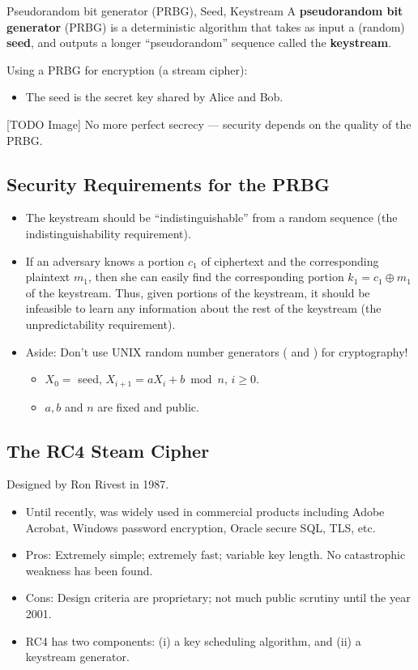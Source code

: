 \begin{Definition}{Pseudorandom bit generator (PRBG), Seed, Keystream}{}
      A \textbf{pseudorandom bit generator} (PRBG) is a
      deterministic algorithm that takes as input a (random) \textbf{seed},
      and outputs a longer ``pseudorandom'' sequence called the \textbf{keystream}.
\end{Definition}

Using a PRBG for encryption (a stream cipher):
\begin{itemize}
      \item The seed is the secret key shared by Alice and Bob.
\end{itemize}
[TODO Image]
No more perfect secrecy --- security depends on the quality of the PRBG\@.

\subsection*{Security Requirements for the PRBG}
\begin{itemize}
      \item The keystream should be ``indistinguishable'' from a random sequence
            (the indistinguishability requirement).
      \item If an adversary knows a portion $c_{1}$ of ciphertext and the corresponding
            plaintext $m_{1}$, then she can easily find the corresponding
            portion $k_{1}=c_{1} \oplus m_{1}$ of the keystream.
            Thus, given portions of the keystream, it should be
            infeasible to learn any information about the rest of
            the keystream (the unpredictability requirement).
      \item Aside: Don't use UNIX random number
            generators ( and ) for cryptography!
            \begin{itemize}
                  \item $X_{0}=$ seed, $X_{i+1}=a X_{i}+b \bmod n $, $ i \geq 0 $.
                  \item $a, b$ and $n$ are fixed and public.
            \end{itemize}
\end{itemize}

\subsection*{The RC4 Steam Cipher}
Designed by Ron Rivest in 1987.
\begin{itemize}
      \item Until recently, was widely used in commercial products including
            Adobe Acrobat, Windows password encryption, Oracle secure SQL, TLS, etc.
      \item Pros: Extremely simple; extremely fast; variable key length.
            No catastrophic weakness has been found.
      \item Cons: Design criteria are proprietary;
            not much public scrutiny until the year 2001.
      \item  RC4 has two components: (i) a key scheduling algorithm, and (ii) a keystream generator.
\end{itemize}

